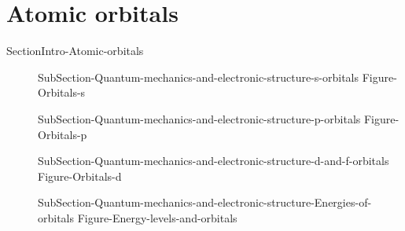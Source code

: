 \documentclass[main.tex]{subfiles}
\newcommand\chapterlabel{Ch-Table}\setcounter{figurenewcounter}{0}\setcounter{tablenewcounter}{0}\setcounter{formulanewcounter}{0}\chapterpicture{../{\chapterlabel}/figure1}\chapterpicturelabel{PxFuel}
\begin{document}
{{ 

 

\section{Atomic orbitals}{SectionIntro-Atomic-orbitals} 
\sloppy\begin{description}
\item[] {SubSection-Quantum-mechanics-and-electronic-structure-s-orbitals} 
 {Figure-Orbitals-s}
\item[] {SubSection-Quantum-mechanics-and-electronic-structure-p-orbitals}
 {Figure-Orbitals-p}
\item[] {SubSection-Quantum-mechanics-and-electronic-structure-d-and-f-orbitals}
{Figure-Orbitals-d}
\item[] {SubSection-Quantum-mechanics-and-electronic-structure-Energies-of-orbitals}
{Figure-Energy-levels-and-orbitals}
\end{description}



}}
\end{document}
